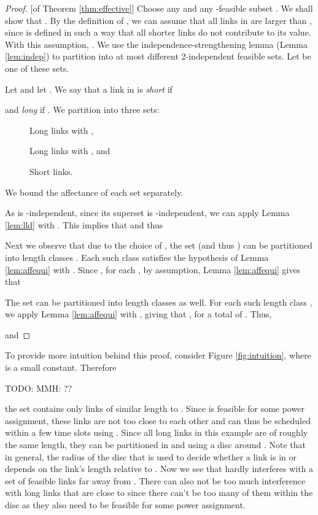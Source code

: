 \documentclass[11pt]{amsart}
\newcommand{\todo}[1]{{\begin{small}\sffamily \color{gray}TODO:  #1 \end{small}}}
\begin{document}
\begin{proof}{[of Theorem \ref{thm:effective}]}
Choose any  and any -feasible subset . We shall show that . By the definition of ,
we can assume that all links in  are larger than , since  is defined in such a way that all shorter links do not contribute to its value. With this assumption, . 
We use the independence-strengthening lemma (Lemma \ref{lem:indep}) 
to partition  into
at most  different 2-independent feasible sets. 
Let  be one of these sets.

Let  and let .
We say that a link  in  is \emph{short} if

and \emph{long} if .
We partition  into three sets:


\begin{description}
\item[] Long links  with ,

\item[] Long links  with , and

\item[] Short links.
\end{description}
We bound the affectance  of each set  separately. 

As  is -independent, since its superset  is -independent, we can apply Lemma \ref{lem:lld} with . This implies that  and thus 


Next we observe that due to the choice of , the set  (and thus ) can be partitioned into  length classes . 
Each such class 
satisfies the hypothesis of Lemma \ref{lem:affequi} with .
Since , for each , by assumption, 
Lemma \ref{lem:affequi} gives that
 

The set  can be partitioned into  
length classes  as well. For each such length class ,
we apply Lemma \ref{lem:affequi} with , giving that
, for a total of . Thus, 

and
  
\end{proof}
To provide more intuition behind this proof, consider Figure \ref{fig:intuition}, where  is a small constant. Therefore\todo{MMH: ??} the set  contains only links of similar length to . Since  is feasible for some power assignment, these links are not too close to each other and can thus be scheduled within a few time slots using . Since all long links in this example are of roughly the same length, they can be partitioned in  and  using a disc around . Note that in general, the radius of the disc that is used to decide whether a link is in  or  depends on the link's length relative to . Now we see that  hardly interferes with a set of feasible links far away from . There can also not be too much interference with long links that are close to  since there can't be too many of them within the disc as they also need to be feasible for some power assignment.
\end{document}
